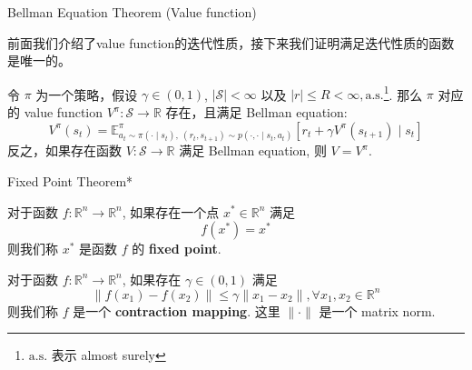 \documentclass[aspectratio=169]{beamer}
\begin{document}
\begin{frame}{Bellman Equation Theorem (Value function)}
    \begin{block}{}
    前面我们介绍了value function的迭代性质，接下来我们证明满足迭代性质的函数是唯一的。
    \end{block}
    \begin{theorem}
        令 $\pi$ 为一个策略，假设 $\gamma\in(0,1)$, $|\mathcal{S}|<\infty$ 以及 $|r|\leq R<\infty, \mathrm{a.s.}$\footnote{$\mathrm{a.s.}$ 表示 almost surely}. 
        那么 $\pi$ 对应的 value function $V^\pi:\mathcal{S}\to\mathbb{R}$ 存在，且满足 Bellman equation:
        \begin{equation}
        V^\pi(s_t) = \mathbb{E}_{a_t\sim \pi(\cdot\mid s_t),\ (r_t,s_{t+1})\sim p(\cdot,\cdot\mid s_t,a_t)}^{\pi}\left[r_t+\gamma V^\pi(s_{t+1})\mid s_t\right]
        \end{equation}
        反之，如果存在函数 $V:\mathcal{S}\to\mathbb{R}$ 满足 Bellman equation, 则 $V=V^\pi$.
    \end{theorem}
\end{frame}

\begin{frame}{Fixed Point Theorem*}
    \begin{definition}
        对于函数 $f:\mathbb{R}^n\to\mathbb{R}^n$, 如果存在一个点 $x^*\in\mathbb{R}^n$ 满足
        \begin{equation}
        f(x^*)=x^*
        \end{equation}
        则我们称 $x^*$ 是函数 $f$ 的 \textbf{fixed point}.
    \end{definition}

    \begin{definition}
        对于函数 $f:\mathbb{R}^n\to\mathbb{R}^n$, 如果存在 $\gamma\in(0,1)$ 满足
        \begin{equation}
            \|f(x_1)-f(x_2)\| \leq \gamma \|x_1-x_2\|,\forall x_1,x_2\in\mathbb{R}^n
        \end{equation}
        则我们称 $f$ 是一个 \textbf{contraction mapping}. 这里 $\|\cdot\|$ 是一个 matrix norm.
    \end{definition}
\end{frame}
\end{document}
